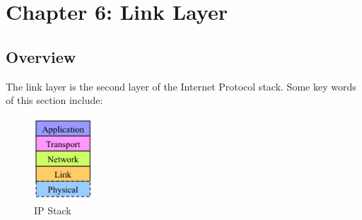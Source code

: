 \documentclass{article}
\begin{document}
\section{Chapter 6: Link Layer}
\subsection{Overview}
The link layer is the second layer of the Internet Protocol stack. Some key words of 
this section include:

\begin{figure}[htbp]
    \centering
    \includegraphics[width=0.2\textwidth]{IPstack.png}
    \caption{IP Stack}
\end{figure}
\end{document}
